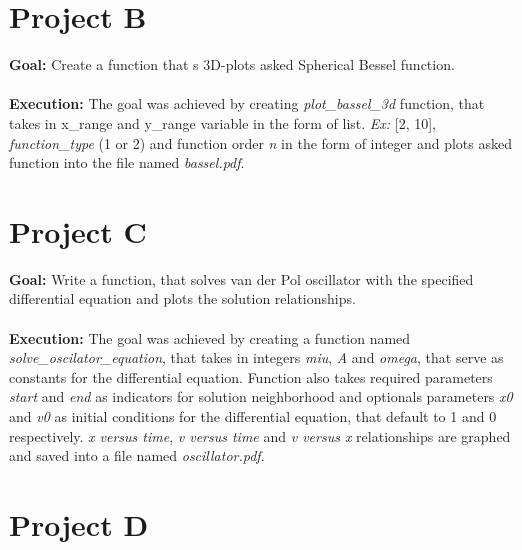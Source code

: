 \documentclass[a4paper,12pt]{article}
\begin{document}
\section{Project B}

\textbf{Goal:} Create a function that s 3D-plots asked Spherical Bessel function. \\ \\ \textbf{Execution:} The goal was achieved by creating \textit{plot\_bassel\_3d} function, that takes in x\_range and y\_range variable in the form of list. \textit{Ex:} [2, 10], \textit{function\_type} (1 or 2) and function order \textit{n} in the form of integer and plots asked function into the file named \textit{bassel.pdf}.


\section{Project C}

\textbf{Goal:} Write a function, that solves van der Pol oscillator with the specified differential equation and plots the solution relationships. \\ \\ \textbf{Execution:} The goal was achieved by creating a function named \textit{solve\_oscilator\_equation}, that takes in integers \textit{miu}, \textit{A} and \textit{omega}, that serve as constants for the differential equation. Function also takes required parameters \textit{start} and \textit{end} as indicators for solution neighborhood and optionals parameters \textit{x0} and \textit{v0} as initial conditions for the differential equation, that default to 1 and 0 respectively. \textit{x versus time}, \textit{v versus time} and \textit{v versus x} relationships are graphed and saved into a file named \textit{oscillator.pdf}. 


\section{Project D}
\end{document}
